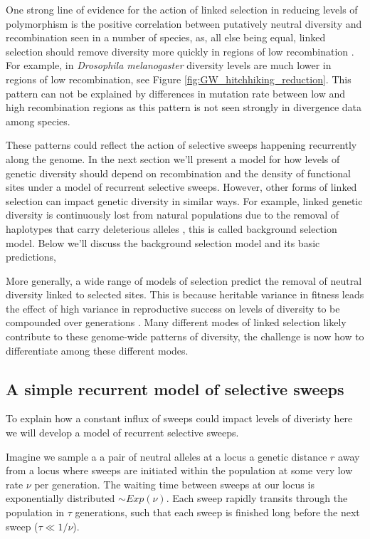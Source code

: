 One strong line of evidence for the action of linked selection in reducing levels of
polymorphism is the positive correlation between putatively
neutral diversity and recombination seen in a number of species, as, all
else being equal, linked selection should remove diversity more quickly in regions of low recombination 
\citep{Aguade:89,Begun:92,Wiehe:93,Cutter:10,Hellmann:08,Cai:09,
  cutter2013}. For example, in {\it Drosophila melanogaster} diversity
levels are much lower in regions of low recombination, see
Figure \ref{fig:GW_hitchhiking_reduction}. This pattern can not be
explained by differences in mutation rate between low and high
recombination regions as this pattern is not seen strongly in
divergence data among species.

These patterns could reflect the action of selective sweeps happening
recurrently along the genome. In the next section we'll present a model for how levels of
genetic diversity should depend on recombination and the density of
functional sites under a model of recurrent selective sweeps.
However, other forms of linked selection can impact genetic
diversity in similar ways. For example, linked genetic diversity is
continuously lost from natural populations due to the removal of
haplotypes that carry deleterious alleles
\citep{Charlesworth:95,Hudson:95}, this is called background selection
model. Below we'll discuss the background selection model and its
basic predictions, 

More generally, a wide range of models of selection predict the removal of neutral
diversity linked to selected sites. This is because heritable variance in fitness
leads the effect of high variance in reproductive success on
levels of diversity to be compounded over generations
\citep{Robertson:61,Santiago:95,Santiago:98,Barton:00,Neher:13,Good:14}. Many
different modes of linked selection likely contribute to these
genome-wide patterns of diversity, the challenge is now how to
differentiate among these different modes.


\subsection{A simple recurrent model of selective sweeps}
To explain how a constant influx of sweeps could impact levels of
diveristy here we will develop a model of recurrent
selective sweeps.

Imagine we sample a a pair of neutral alleles at a locus a genetic distance $r$ away from a locus where
sweeps are initiated within the population at some very low rate $\nu$
per generation. The waiting time between sweeps
at our locus is exponentially distributed $\sim Exp(\nu)$. Each sweep rapidly transits through the population in $\tau$
generations, such that each sweep is finished long before the next
sweep ($\tau \ll 1/\nu$). \\

